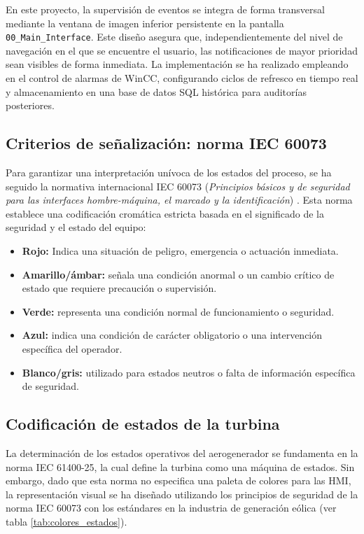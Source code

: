 En este proyecto, la supervisión de eventos se integra de forma transversal mediante la ventana de imagen inferior persistente en la pantalla \texttt{00\_Main\_Interface}. Este diseño asegura que, independientemente del nivel de navegación en el que se encuentre el usuario, las notificaciones de mayor prioridad sean visibles de forma inmediata. La implementación se ha realizado empleando en el control de alarmas de WinCC, configurando ciclos de refresco en tiempo real y almacenamiento en una base de datos SQL histórica para auditorías posteriores.

\subsection{Criterios de señalización: norma IEC 60073}

Para garantizar una interpretación unívoca de los estados del proceso, se ha seguido la normativa internacional IEC 60073 (\textit{Principios básicos y de seguridad para las interfaces hombre-máquina, el marcado y la identificación}) \cite{iec60073}. Esta norma establece una codificación cromática estricta basada en el significado de la seguridad y el estado del equipo:

\begin{itemize}
    \item \textbf{Rojo:} Indica una situación de peligro, emergencia o actuación inmediata.
    \item \textbf{Amarillo/ámbar:} señala una condición anormal o un cambio crítico de estado que requiere precaución o supervisión.
    \item \textbf{Verde:} representa una condición normal de funcionamiento o seguridad.
    \item \textbf{Azul:} indica una condición de carácter obligatorio o una intervención específica del operador.
    \item \textbf{Blanco/gris:} utilizado para estados neutros o falta de información específica de seguridad.
\end{itemize}
\FloatBarrier
\subsection{Codificación de estados de la turbina}

La determinación de los estados operativos del aerogenerador se fundamenta en la norma IEC 61400-25, la cual define la turbina como una máquina de estados. Sin embargo, dado que esta norma no especifica una paleta de colores para las \ac{HMI}, la representación visual se ha diseñado utilizando los principios de seguridad de la norma IEC 60073 con los estándares en la industria de generación eólica (ver tabla \ref{tab:colores_estados}).

